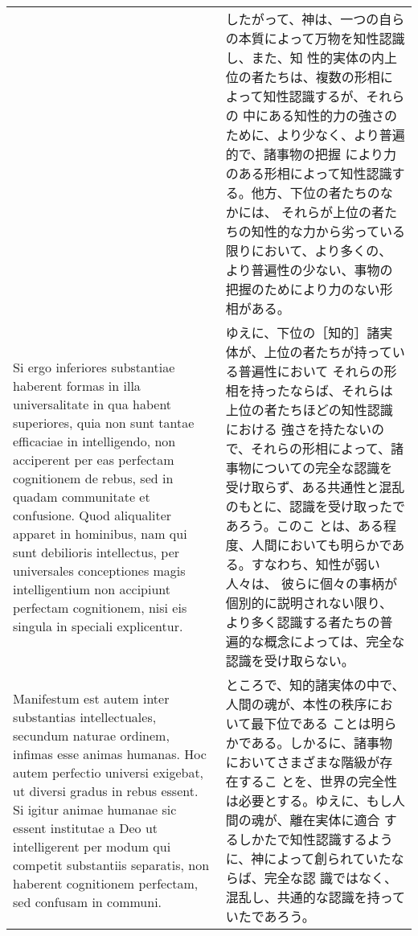 \documentclass[10pt]{jsarticle} %
\begin{document}
\begin{longtable}{p{21em}p{21em}}
& したがって、神は、一つの自らの本質によって万物を知性認識し、また、知
性的実体の内上位の者たちは、複数の形相によって知性認識するが、それらの
中にある知性的力の強さのために、より少なく、より普遍的で、諸事物の把握
により力のある形相によって知性認識する。他方、下位の者たちのなかには、
それらが上位の者たちの知性的な力から劣っている限りにおいて、より多くの、
より普遍性の少ない、事物の把握のためにより力のない形相がある。

\\



Si ergo inferiores substantiae haberent formas in illa universalitate
in qua habent superiores, quia non sunt tantae efficaciae in
intelligendo, non acciperent per eas perfectam cognitionem de rebus,
sed in quadam communitate et confusione. Quod aliqualiter apparet in
hominibus, nam qui sunt debilioris intellectus, per universales
conceptiones magis intelligentium non accipiunt perfectam cognitionem,
nisi eis singula in speciali explicentur.


&

ゆえに、下位の［知的］諸実体が、上位の者たちが持っている普遍性において
それらの形相を持ったならば、それらは上位の者たちほどの知性認識における
強さを持たないので、それらの形相によって、諸事物についての完全な認識を
受け取らず、ある共通性と混乱のもとに、認識を受け取ったであろう。このこ
とは、ある程度、人間においても明らかである。すなわち、知性が弱い人々は、
彼らに個々の事柄が個別的に説明されない限り、より多く認識する者たちの普
遍的な概念によっては、完全な認識を受け取らない。

\\


Manifestum est autem inter substantias intellectuales, secundum
naturae ordinem, infimas esse animas humanas. Hoc autem perfectio
universi exigebat, ut diversi gradus in rebus essent. Si igitur animae
humanae sic essent institutae a Deo ut intelligerent per modum qui
competit substantiis separatis, non haberent cognitionem perfectam,
sed confusam in communi.


&

ところで、知的諸実体の中で、人間の魂が、本性の秩序において最下位である
ことは明らかである。しかるに、諸事物においてさまざまな階級が存在するこ
とを、世界の完全性は必要とする。ゆえに、もし人間の魂が、離在実体に適合
するしかたで知性認識するように、神によって創られていたならば、完全な認
識ではなく、混乱し、共通的な認識を持っていたであろう。

\\




\end{longtable}
\end{document}

